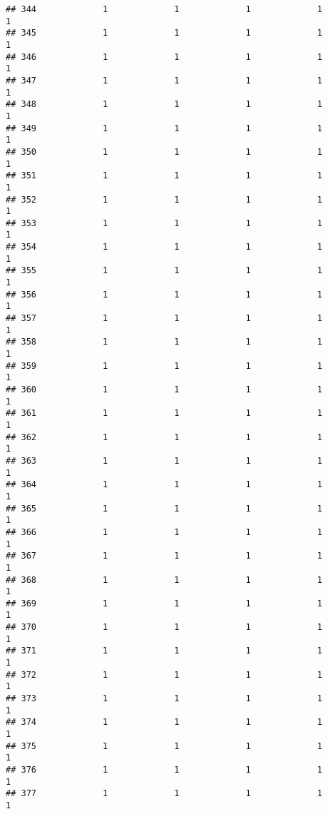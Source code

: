 \documentclass[
]{article}
\begin{document}
\begin{verbatim}
## 344             1             1             1             1             1
## 345             1             1             1             1             1
## 346             1             1             1             1             1
## 347             1             1             1             1             1
## 348             1             1             1             1             1
## 349             1             1             1             1             1
## 350             1             1             1             1             1
## 351             1             1             1             1             1
## 352             1             1             1             1             1
## 353             1             1             1             1             1
## 354             1             1             1             1             1
## 355             1             1             1             1             1
## 356             1             1             1             1             1
## 357             1             1             1             1             1
## 358             1             1             1             1             1
## 359             1             1             1             1             1
## 360             1             1             1             1             1
## 361             1             1             1             1             1
## 362             1             1             1             1             1
## 363             1             1             1             1             1
## 364             1             1             1             1             1
## 365             1             1             1             1             1
## 366             1             1             1             1             1
## 367             1             1             1             1             1
## 368             1             1             1             1             1
## 369             1             1             1             1             1
## 370             1             1             1             1             1
## 371             1             1             1             1             1
## 372             1             1             1             1             1
## 373             1             1             1             1             1
## 374             1             1             1             1             1
## 375             1             1             1             1             1
## 376             1             1             1             1             1
## 377             1             1             1             1             1

\end{verbatim}
\end{document}
